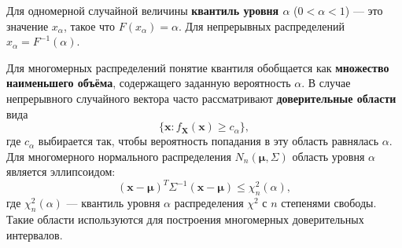 \documentclass[10pt]{article}
\begin{document}
\begin{definition}
Для одномерной случайной величины \textbf{квантиль уровня $\alpha$} ($0 < \alpha < 1$) — это значение $x_\alpha$, такое что $F(x_\alpha) = \alpha$. Для непрерывных распределений $x_\alpha = F^{-1}(\alpha)$.
\end{definition}

Для многомерных распределений понятие квантиля обобщается как \textbf{множество наименьшего объёма}, содержащего заданную вероятность $\alpha$. В случае непрерывного случайного вектора часто рассматривают \textbf{доверительные области} вида
\[
\{\mathbf{x} : f_{\mathbf{X}}(\mathbf{x}) \ge c_\alpha\},
\]
где $c_\alpha$ выбирается так, чтобы вероятность попадания в эту область равнялась $\alpha$. Для многомерного нормального распределения $N_n(\boldsymbol{\mu}, \Sigma)$ область уровня $\alpha$ является эллипсоидом:
\[
(\mathbf{x} - \boldsymbol{\mu})^T \Sigma^{-1} (\mathbf{x} - \boldsymbol{\mu}) \le \chi^2_n(\alpha),
\]
где $\chi^2_n(\alpha)$ — квантиль уровня $\alpha$ распределения $\chi^2$ с $n$ степенями свободы. Такие области используются для построения многомерных доверительных интервалов.
\end{document}
